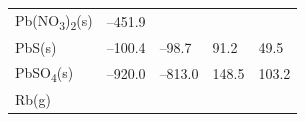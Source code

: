 \documentclass[
  9pt,
]{extbook}
\theoremstyle{definition}
\theoremstyle{definition}
\theoremstyle{definition}
\theoremstyle{remark}
\begin{document}
\begin{longtable}[]{@{}lllll@{}}
\begin{minipage}[t]{0.10\columnwidth}
Pb(NO\textsubscript{3})\textsubscript{2}(s)\strut
\end{minipage} & \begin{minipage}[t]{0.19\columnwidth}\raggedright
--451.9\strut
\end{minipage} & \begin{minipage}[t]{0.20\columnwidth}\raggedright
\strut
\end{minipage} & \begin{minipage}[t]{0.18\columnwidth}\raggedright
\strut
\end{minipage} & \begin{minipage}[t]{0.18\columnwidth}\raggedright
\strut
\end{minipage}\tabularnewline
\begin{minipage}[t]{0.10\columnwidth}\raggedright
PbS(s)\strut
\end{minipage} & \begin{minipage}[t]{0.19\columnwidth}\raggedright
--100.4\strut
\end{minipage} & \begin{minipage}[t]{0.20\columnwidth}\raggedright
--98.7\strut
\end{minipage} & \begin{minipage}[t]{0.18\columnwidth}\raggedright
91.2\strut
\end{minipage} & \begin{minipage}[t]{0.18\columnwidth}\raggedright
49.5\strut
\end{minipage}\tabularnewline
\begin{minipage}[t]{0.10\columnwidth}\raggedright
PbSO\textsubscript{4}(s)\strut
\end{minipage} & \begin{minipage}[t]{0.19\columnwidth}\raggedright
--920.0\strut
\end{minipage} & \begin{minipage}[t]{0.20\columnwidth}\raggedright
--813.0\strut
\end{minipage} & \begin{minipage}[t]{0.18\columnwidth}\raggedright
148.5\strut
\end{minipage} & \begin{minipage}[t]{0.18\columnwidth}\raggedright
103.2\strut
\end{minipage}\tabularnewline
\begin{minipage}[t]{0.10\columnwidth}\raggedright
Rb(g)\strut
\end{minipage} & \begin{minipage}[t]{0.19\columnwidth}\raggedright

\end{minipage}
\end{longtable}
\end{document}
